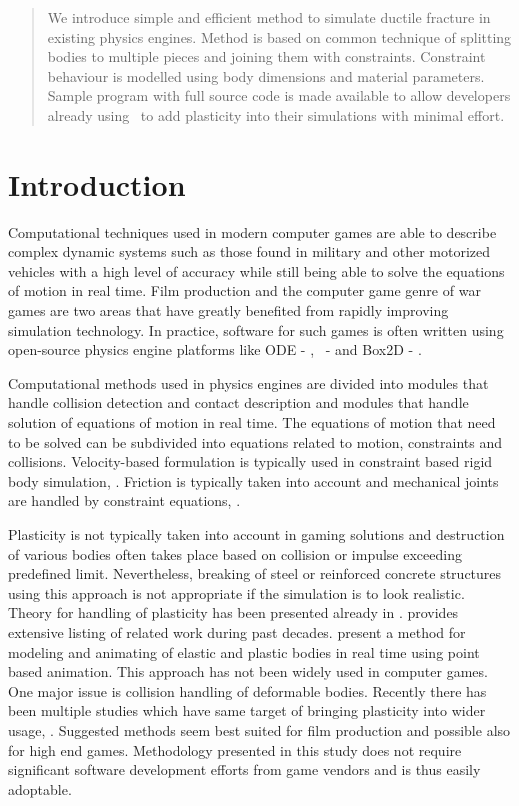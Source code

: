 \begin{abstract}
We introduce simple and efficient method to simulate ductile fracture in existing physics engines.
Method is based on common technique of splitting bodies to multiple pieces and joining them with constraints.
Constraint behaviour is modelled using body dimensions and material parameters.
Sample program with full source code is made available to allow developers already using \cbullet\
to add plasticity into their simulations with minimal effort.
\end{abstract}

\section{Introduction}

Computational techniques used in modern computer games are able to describe
complex dynamic systems such as those found in military and other motorized vehicles
with a high level of accuracy while still being able to solve the equations of motion in real time.
Film production and the computer game genre of war games
are two areas that have greatly benefited from rapidly improving simulation technology. 
In practice, software for such games is often written using open-source physics engine platforms  
like ODE - \cite{ode}, \cbullet\ - \cite{bullet} and Box2D - \cite{box2d}.

Computational methods used in physics engines are divided into modules that handle collision detection and 
contact description and modules that handle solution of equations of motion in real time. 
The equations of motion that need to be 
solved can be subdivided into equations related to motion, constraints and collisions. 
Velocity-based formulation is typically used in constraint based rigid body simulation, \cite{erleben.thesis}. 
Friction is typically taken into account and mechanical joints are handled by constraint equations,
\cite{erleben.thesis}.

Plasticity is not typically taken into account in gaming solutions and 
destruction of various bodies often takes place based on collision or impulse exceeding predefined limit.
Nevertheless, breaking of steel or reinforced concrete structures using this approach 
is not appropriate if the simulation is to look realistic. Theory for handling of plasticity 
has been presented already in \cite{cg1988}. 
\cite{Jones:2016:EPD} provides extensive listing of related work during past decades.
\cite{muller2005meshless} 
present a method for modeling and animating of elastic and plastic bodies in real time using 
point based animation. This approach has not been widely used in computer games.  
One major issue is collision handling of deformable bodies.
Recently there has been multiple studies which have same target of bringing plasticity 
into wider usage, \cite{Jones:2016:EPD,Patkar:2015:EDB,Budsberg:2014:EPD}.
Suggested methods seem best suited for film production and possible also for high end games.
Methodology presented in this study does not require significant software development efforts from
game vendors and is thus easily adoptable. 

